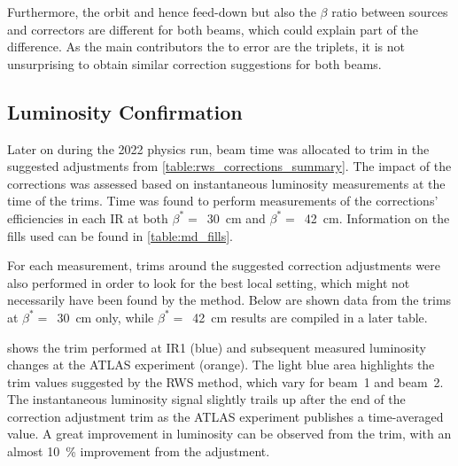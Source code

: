 Furthermore, the orbit and hence feed-down but also the \(\beta\) ratio between sources and correctors are different for both beams, which could explain part of the difference.
As the main contributors the to error are the triplets, it is not unsurprising to obtain similar correction suggestions for both beams.

\subsection{Luminosity Confirmation}
\label{subsection:lumi_correction_trims}

Later on during the \num{2022} physics run, beam time was allocated to trim in the suggested adjustments from \cref{table:rws_corrections_summary}.
The impact of the corrections was assessed based on instantaneous luminosity measurements at the time of the trims.
Time was found to perform measurements of the corrections' efficiencies in each IR at both \(\beta^{\ast} =\)~\qty{30}{\centi\meter} and \(\beta^{\ast} =\)~\qty{42}{\centi\meter}.
Information on the fills used can be found in \cref{table:md_fills}.

For each measurement, trims around the suggested correction adjustments were also performed in order to look for the best local setting, which might not necessarily have been found by the method.
Below are shown data from the trims at \(\beta^{\ast} =\)~\qty{30}{\centi\meter} only, while \(\beta^{\ast} =\)~\qty{42}{\centi\meter} results are compiled in a later table.
\newline

 shows the trim performed at IR\num{1} (\textcolor{mplblue}{blue}) and subsequent measured luminosity changes at the ATLAS experiment (\textcolor{mplorange}{orange}).
The light blue area highlights the trim values suggested by the RWS method, which vary for beam~\num{1} and beam~\num{2}.
The instantaneous luminosity signal slightly trails up after the end of the correction adjustment trim as the ATLAS experiment publishes a time-averaged value.
A great improvement in luminosity can be observed from the trim, with an almost \qty{10}{\percent} improvement from the adjustment.

